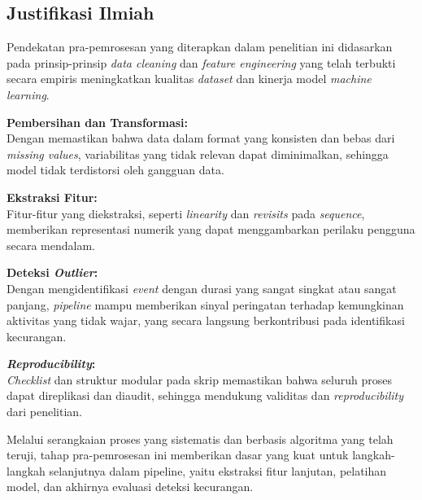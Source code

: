 \subsection{Justifikasi Ilmiah}
\label{sec:justifikasiIlmiah}
Pendekatan pra-pemrosesan yang diterapkan dalam penelitian ini didasarkan pada prinsip-prinsip \textit{data cleaning} dan \textit{feature engineering} yang telah terbukti secara empiris meningkatkan kualitas \textit{dataset} dan kinerja model \textit{machine learning}.

\textbf{Pembersihan dan Transformasi:} \\
Dengan memastikan bahwa data dalam format yang konsisten dan bebas dari \textit{missing values}, variabilitas yang tidak relevan dapat diminimalkan, sehingga model tidak terdistorsi oleh gangguan data.

\textbf{Ekstraksi Fitur:} \\
Fitur-fitur yang diekstraksi, seperti \textit{linearity} dan \textit{revisits} pada \textit{sequence}, memberikan representasi numerik yang dapat menggambarkan perilaku pengguna secara mendalam.

\textbf{Deteksi \textit{Outlier}:} \\
Dengan mengidentifikasi \textit{event} dengan durasi yang sangat singkat atau sangat panjang, \textit{pipeline} mampu memberikan sinyal peringatan terhadap kemungkinan aktivitas yang tidak wajar, yang secara langsung berkontribusi pada identifikasi kecurangan.

\textbf{\textit{Reproducibility}:} \\
\textit{Checklist} dan struktur modular pada skrip memastikan bahwa seluruh proses dapat direplikasi dan diaudit, sehingga mendukung validitas dan \textit{reproducibility} dari penelitian.

Melalui serangkaian proses yang sistematis dan berbasis algoritma yang telah teruji, tahap pra-pemrosesan ini memberikan dasar yang kuat untuk langkah-langkah selanjutnya dalam pipeline, yaitu ekstraksi fitur lanjutan, pelatihan model, dan akhirnya evaluasi deteksi kecurangan.

